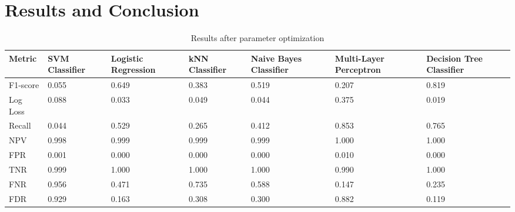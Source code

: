 \documentclass[letterpaper, 11 pt, conference]{ieeeconf}  %
\begin{document}
\section{Results and Conclusion}
\begin{table}[h]
	\hspace{-1.4cm}
	\begin{tabular}{|p{0.8cm}|p{1.1cm}|p{1.1cm}|p{1.1cm}|p{1.1cm}|p{1.1cm}|p{1.1cm}|}%
		\hline
		\textbf{Metric} &  \textbf{SVM} Classifier &  \textbf{Logistic Regression }&  \textbf{kNN} Classifier &  \textbf{Naive Bayes }Classifier &  \textbf{Multi-Layer Perceptron }&  \textbf{Decision Tree} Classifier \\\hline
		F1-score        &           0.055 &                0.649 &           0.383 &                   0.519 &                   0.207 &           0.819 \\
		Log Loss   &           0.088 &                0.033 &           0.049 &                   0.044 &                   0.375 &           0.019\\
		Recall    &           0.044 &                0.529 &           0.265 &                   0.412 &                   0.853 &           0.765 \\
		NPV       &           0.998 &                0.999 &           0.999 &                   0.999 &                   1.000 &           1.000 \\
		FPR       &           0.001 &                0.000 &           0.000 &                   0.000 &                   0.010 &           0.000 \\
		TNR       &           0.999 &                1.000 &           1.000 &                   1.000 &                   0.990 &           1.000 \\
		FNR       &           0.956 &                0.471 &           0.735 &                   0.588 &                   0.147 &           0.235 \\
		FDR       &           0.929 &                0.163 &           0.308 &                   0.300 &                   0.882 &           0.119\\
		\hline
	\end{tabular}	
	\caption{Results after parameter optimization}
	\label{tb:final}
\end{table}
\end{document}
